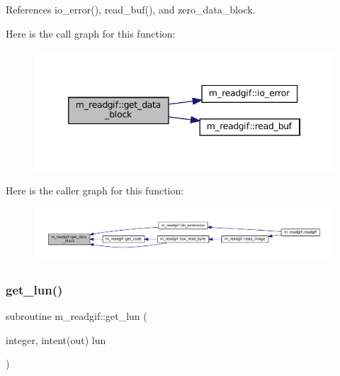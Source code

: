 References io\+\_\+error(), read\+\_\+buf(), and zero\+\_\+data\+\_\+block.

Here is the call graph for this function\+:
\nopagebreak
\begin{figure}[H]
\begin{center}
\leavevmode
\includegraphics[width=346pt]{namespacem__readgif_ace6e51d0293107696bd1482348414a43_cgraph}
\end{center}
\end{figure}
Here is the caller graph for this function\+:
\nopagebreak
\begin{figure}[H]
\begin{center}
\leavevmode
\includegraphics[width=350pt]{namespacem__readgif_ace6e51d0293107696bd1482348414a43_icgraph}
\end{center}
\end{figure}
\mbox{\label{namespacem__readgif_a7109d632cddcb8d66729d25bbed5c33c}} 
\subsubsection{\texorpdfstring{get\+\_\+lun()}{get\_lun()}}
{\footnotesize\ttfamily subroutine m\+\_\+readgif\+::get\+\_\+lun (\begin{DoxyParamCaption}\item[{integer, intent(out)}]{lun }\end{DoxyParamCaption})\hspace{0.3cm}{\ttfamily [private]}}

